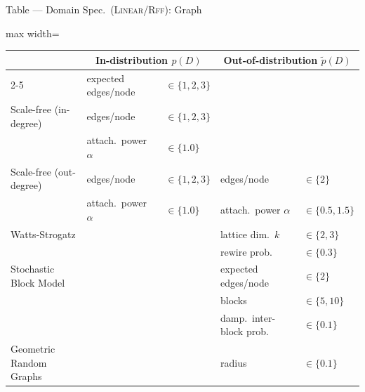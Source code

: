 \documentclass[aspectratio=169,10pt]{beamer}
\newcommand{\domain}[1]{\textsc{#1}}
\newcommand{\lineardomain}{\domain{Linear}\xspace}
\newcommand{\rffdomain}{\domain{Rff}\xspace}
\newcommand\erdosrenyi{\text{Erd{\H{o}}s-R{\'e}nyi}\xspace}
\begin{document}
\begin{frame}{Table --- Domain Spec.\ (\lineardomain/\rffdomain): Graph}
\scriptsize
\begin{adjustbox}{max width=\textwidth}
\begin{tabular}{lllll}
\toprule
 & \multicolumn{2}{c}{In-distribution $p(D)$} & \multicolumn{2}{c}{Out-of-distribution $\tilde{p}(D)$} \\
\cmidrule{2-5}
\erdosrenyi & expected edges/node & $\in \{1, 2, 3\}$ &  &  \\
Scale-free (in-degree) & edges/node & $\in \{1, 2, 3\}$ &  & \\
 & attach.\ power $\alpha$  & $\in \{1.0\}$ &  &  \\
Scale-free (out-degree) & edges/node & $\in \{1, 2, 3\}$ & edges/node & $\in \{2\}$\\
 & attach.\ power $\alpha$ & $\in \{1.0\}$ & attach.\ power $\alpha$  & $\in \{0.5, 1.5\}$ \\
Watts-Strogatz &&& lattice dim.\ $k$ & $\in \{2, 3\}$ \\
&&& rewire prob.\ & $\in \{0.3\}$ \\
Stochastic Block Model &&& expected edges/node & $\in \{2\}$ \\
&&& blocks & $\in \{5, 10\}$ \\
&&& damp.\ inter-block prob. & $\in \{0.1\}$ \\
Geometric Random Graphs &&& radius & $\in \{0.1\}$ \\
\bottomrule
\end{tabular}
\end{adjustbox}
\end{frame}
\end{document}
